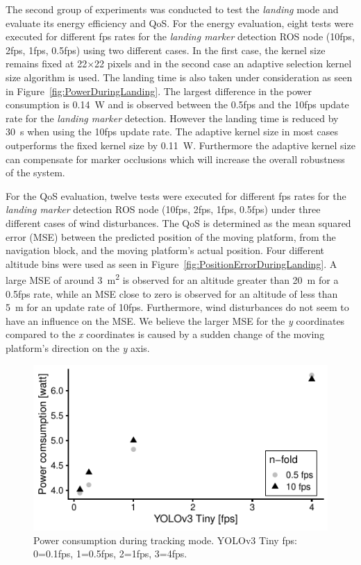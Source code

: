 \documentclass[conference]{IEEEtran}
\begin{document}
The second group of experiments was conducted to test the \emph{landing} mode
and evaluate its energy efficiency and QoS.
For the energy evaluation, eight tests were executed for different 
fps rates for the \emph{landing marker} detection ROS node 
(10fps, 2fps, 1fps, 0.5fps) using two different cases. 
In the first case, the kernel size remains fixed at 
\SI{22}{}$\times$\SI{22}{} pixels and in the second case an adaptive selection 
kernel size algorithm is used. 
%
The landing time is also taken under consideration as seen in
Figure~\ref{fig:PowerDuringLanding}. The largest difference in the
power consumption is \SI{0.14}{\watt} and is observed between the 0.5fps and
the 10fps update rate for the \emph{landing marker} detection. However
the landing time is reduced by \SI{30}{\second} when using the 10fps update
rate. The adaptive kernel size in most cases outperforms the fixed
kernel size by \SI{0.11}{\watt}. Furthermore the adaptive kernel size can
compensate for marker occlusions which will increase the overall
robustness of the system.

For the QoS evaluation, twelve tests were executed for different 
fps rates for the \emph{landing marker} detection ROS node 
(10fps, 2fps, 1fps, 0.5fps) under three different cases of wind
disturbances. The QoS is determined as the  mean squared error (MSE) 
between the predicted position of the moving platform, 
from the navigation block, and the moving platform's actual position. 
Four different altitude bins were used as seen in 
Figure~\ref{fig:PositionErrorDuringLanding}. 
A large MSE of around \SI{3}{\square\meter} is observed for an altitude 
greater than \SI{20}{\meter} for a 0.5fps rate, while an MSE close to 
zero is observed for an altitude of less than \SI{5}{\meter} for an 
update rate of 10fps. Furthermore, wind disturbances do not seem to 
have an influence on the MSE. We believe the larger MSE for the \emph{y} 
coordinates compared to the \emph{x} coordinates is caused by a 
sudden change of the moving platform's direction on the \emph{y} axis.

\begin{figure}[t]
  \centering
  \includegraphics{data_visualization/PowerDetection.pdf}
  \caption{Power consumption during tracking mode. YOLOv3 Tiny fps:
    0=0.1fps, 1=0.5fps, 2=1fps, 3=4fps.}
  \label{fig:PowerDuringTracking}
\end{figure}
  
\end{document}
